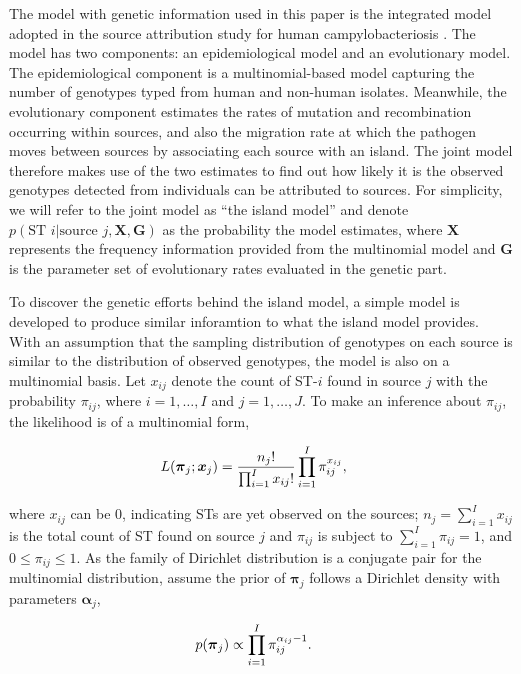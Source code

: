 \documentclass[times, doublespace]{WileyNJD-v2}%
\begin{document}
The model with genetic information used in this paper is the integrated model \cite{Wilso} adopted in the source attribution study for human campylobacteriosis \cite{Marsh}. The model has two components: an epidemiological model and an evolutionary model. The epidemiological component is a multinomial-based model capturing the number of genotypes typed from human and non-human isolates. Meanwhile, the evolutionary component estimates the rates of mutation and recombination occurring within sources, and also the migration rate at which the pathogen moves between sources by associating each source with an island. The joint model therefore makes use of the two estimates to find out how likely it is the observed genotypes detected from individuals can be attributed to sources. For simplicity, we will refer to the joint model as ``the island model'' and denote $p(\text{ST }i\vert \text{source }j, \boldsymbol{X}, \boldsymbol{G})$ as the probability the model estimates, where $\boldsymbol{X}$ represents the frequency information provided from the multinomial model and $\boldsymbol{G}$ is the parameter set of evolutionary rates evaluated in the genetic part.

To discover the genetic efforts behind the island model, a simple model is developed to produce similar inforamtion to what the island model provides. With an assumption that the sampling distribution of genotypes on each source is similar to the distribution of observed genotypes, the model is also on a multinomial basis. Let $x_{ij}$ denote the count of ST-$i$ found in source $j$ with the probability $\pi_{ij}$, where $i=1, \ldots, I$ and $j=1, \ldots, J$. To make an inference about $\pi_{ij}$, the likelihood is of a multinomial form,

\begin{align}
        L(\boldsymbol{\pi}_{j} ; \boldsymbol{x}_{j}) & = \frac{n_j!}{\prod_{i=1}^{I} x_{ij}!} \prod_{i=1}^I \pi_{ij}^{x_{ij}}, \notag
\end{align}

where $x_{ij}$ can be $0$, indicating STs are yet observed on the sources; $n_j=\sum_{i=1}^I x_{ij}$ is the total count of ST found on source $j$ and $\pi_{ij}$ is subject to $\sum_{i=1}^I \pi_{ij} =1$, and $0 \leq \pi_{ij} \leq 1$. As the family of Dirichlet distribution is a conjugate pair for the multinomial distribution, assume the prior of $\boldsymbol{\pi}_{j}$ follows a Dirichlet density with parameters $\boldsymbol{\alpha}_{j}$, 

\begin{align}
  p(\boldsymbol{\pi}_{j}) & \propto \prod_{i=1}^{I}\pi_{ij}^{\alpha_{ij}-1}. \notag
\end{align}
\end{document}
